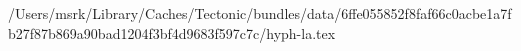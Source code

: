 /Users/msrk/Library/Caches/Tectonic/bundles/data/6ffe055852f8faf66c0acbe1a7fb27f87b869a90bad1204f3bf4d9683f597c7c/hyph-la.tex